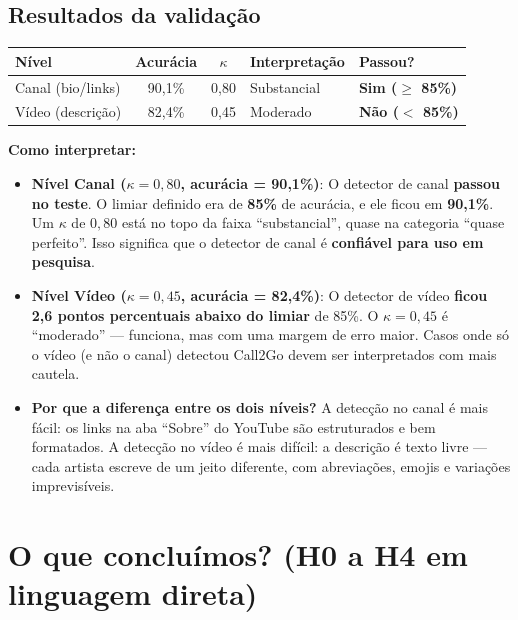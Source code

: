 \documentclass[12pt,a4paper]{article}
\newcommand{\num}[1]{\textcolor{azul}{\textbf{#1}}}
\newcommand{\ok}[1]{\textcolor{verde}{\textbf{#1}}}
\newcommand{\alerta}[1]{\textcolor{laranja}{\textbf{#1}}}
\begin{document}
\subsection{Resultados da validação}

\medskip
\begin{center}
\begin{tabular}{lccll}
\toprule
\textbf{Nível} & \textbf{Acurácia} & $\kappa$ & \textbf{Interpretação} &
  \textbf{Passou?} \\
\midrule
Canal (bio/links) & 90,1\% & 0,80 & Substancial & \ok{Sim ($\geq$ 85\%)} \\
Vídeo (descrição) & 82,4\% & 0,45 & Moderado    & \alerta{Não ($<$ 85\%)} \\
\bottomrule
\end{tabular}
\end{center}
\medskip

\textbf{Como interpretar:}

\begin{itemize}
  \item \textbf{Nível Canal ($\kappa = 0{,}80$, acurácia = 90,1\%)}: O
        detector de canal \ok{passou no teste}. O limiar definido era de
        \num{85\%} de acurácia, e ele ficou em \num{90,1\%}. Um $\kappa$ de
        $0{,}80$ está no topo da faixa ``substancial'', quase na categoria
        ``quase perfeito''. Isso significa que o detector de canal é
        \textbf{confiável para uso em pesquisa}.

  \item \textbf{Nível Vídeo ($\kappa = 0{,}45$, acurácia = 82,4\%)}: O
        detector de vídeo \alerta{ficou 2,6 pontos percentuais abaixo do
        limiar} de 85\%. O $\kappa = 0{,}45$ é ``moderado'' --- funciona,
        mas com uma margem de erro maior. Casos onde só o vídeo (e não o
        canal) detectou Call2Go devem ser interpretados com mais cautela.

  \item \textbf{Por que a diferença entre os dois níveis?} A detecção no
        canal é mais fácil: os links na aba ``Sobre'' do YouTube são
        estruturados e bem formatados. A detecção no vídeo é mais difícil:
        a descrição é texto livre --- cada artista escreve de um jeito
        diferente, com abreviações, emojis e variações imprevisíveis.
\end{itemize}

\section{O que concluímos? (H0 a H4 em linguagem direta)}
\end{document}
